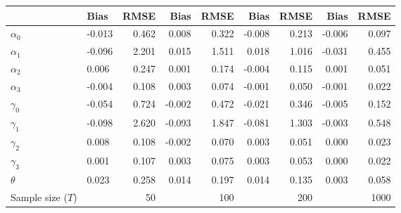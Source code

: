 
\begin{tabular}[t]{llrrrrrrr}
\toprule
  & Bias & RMSE & Bias & RMSE & Bias & RMSE & Bias & RMSE\\
\midrule
$\alpha_{0}$ & -0.013 & 0.462 & 0.008 & 0.322 & -0.008 & 0.213 & -0.006 & 0.097\\
$\alpha_{1}$ & -0.096 & 2.201 & 0.015 & 1.511 & 0.018 & 1.016 & -0.031 & 0.455\\
$\alpha_{2}$ & 0.006 & 0.247 & 0.001 & 0.174 & -0.004 & 0.115 & 0.001 & 0.051\\
$\alpha_{3}$ & -0.004 & 0.108 & 0.003 & 0.074 & -0.001 & 0.050 & -0.001 & 0.022\\
$\gamma_{0}$ & -0.054 & 0.724 & -0.002 & 0.472 & -0.021 & 0.346 & -0.005 & 0.152\\
$\gamma_{1}$ & -0.098 & 2.620 & -0.093 & 1.847 & -0.081 & 1.303 & -0.003 & 0.548\\
$\gamma_{2}$ & 0.008 & 0.108 & -0.002 & 0.070 & 0.003 & 0.051 & 0.000 & 0.023\\
$\gamma_{3}$ & 0.001 & 0.107 & 0.003 & 0.075 & 0.003 & 0.053 & 0.000 & 0.022\\
$\theta$ & 0.023 & 0.258 & 0.014 & 0.197 & 0.014 & 0.135 & 0.003 & 0.058\\
Sample size ($T$) &  & 50 &  & 100 &  & 200 &  & 1000\\
\bottomrule
\end{tabular}
